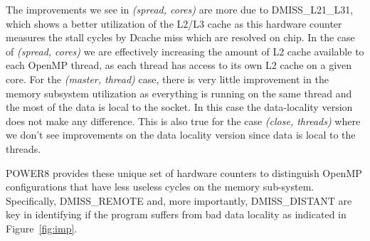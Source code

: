 The improvements we see in \textit{(spread, cores)} are more due to DMISS\_L21\_L31, which shows a better utilization of the L2/L3 cache as this hardware counter measures the stall cycles by Dcache miss which are resolved on chip. 
In the case of  \textit{(spread, cores)} we are effectively increasing the amount of 
L2 cache available to each OpenMP thread, as each thread has access to its own L2 cache on a given core. 
For the \textit{(master, thread)} case, there is very little improvement in the memory subsystem utilization as everything is running on the same thread and the most of the data is local to the socket. In this case the data-locality version does not make any difference. This is also true for the case  \textit{(close, threads)} where
 we don't see improvements on the data locality version since data is local to the threads.

POWER8 provides these unique set of hardware counters to distinguish OpenMP configurations that have less useless cycles on the memory sub-system. Specifically, DMISS\_REMOTE and, more importantly, DMISS\_DISTANT are key in identifying if the program suffers from bad data locality as indicated in Figure~\ref{fig:imp}.


